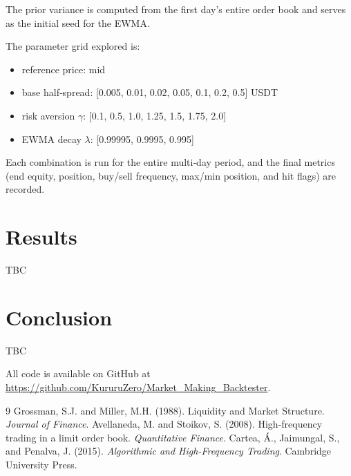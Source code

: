 \documentclass[11pt,a4paper]{article}
\begin{document}
The prior variance is computed from the first day’s entire order book and serves as the initial seed for the EWMA.

The parameter grid explored is:
\begin{itemize}
    \item reference price: mid
    \item base half‑spread: [0.005, 0.01, 0.02, 0.05, 0.1, 0.2, 0.5] USDT
    \item risk aversion \(\gamma\): [0.1, 0.5, 1.0, 1.25, 1.5, 1.75, 2.0]
    \item EWMA decay \(\lambda\): [0.99995, 0.9995, 0.995]
\end{itemize}

Each combination is run for the entire multi‑day period, and the final metrics (end equity, position, buy/sell frequency, max/min position, and hit flags) are recorded.

\section{Results}
TBC
\section{Conclusion}
TBC

All code is available on GitHub at \url{https://github.com/KururuZero/Market_Making_Backtester}.

\begin{thebibliography}{9}
 Grossman, S.J. and Miller, M.H. (1988). Liquidity and Market Structure. \textit{Journal of Finance}.
  Avellaneda, M. and Stoikov, S. (2008). High‑frequency trading in a limit order book. \textit{Quantitative Finance}.
 Cartea, Á., Jaimungal, S., and Penalva, J. (2015). \textit{Algorithmic and High‑Frequency Trading}. Cambridge University Press.
\end{thebibliography}
\end{document}
